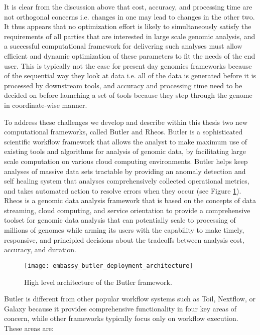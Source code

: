 It is clear from the discussion above that cost, accuracy, and processing time are not orthogonal concerns i.e. changes in one may lead to changes in the other two. It thus appears that no optimization effort is likely to simultaneously satisfy the requirements of all parties that are interested in large scale genomic analysis, and a successful computational framework for delivering such analyses must allow efficient and dynamic optimization of these parameters to fit the needs of the end user. This is typically not the case for present day genomics frameworks because of the sequential way they look at data\autocite{mckenna2010genome, van2013fastq} i.e. all of the data is generated before it is processed by downstream tools, and accuracy and processing time need to be decided on before launching a set of tools because they step through the genome in coordinate-wise manner.

To address these challenges we develop and describe within this thesis two new computational frameworks, called Butler and Rheos. Butler is a sophisticated scientific workflow framework that allows the analyst to make maximum use of existing tools and algorithms for analysis of genomic data, by facilitating large scale computation on various cloud computing environments. Butler helps keep analyses of massive data sets tractable by providing an anomaly detection and self healing system that analyses comprehensively collected operational metrics, and takes automated action to resolve errors when they occur (see Figure \ref{fig:butler_architecture}). Rheos is a genomic data analysis framework that is based on the concepts of data streaming, cloud computing, and service orientation to provide a comprehensive toolset for genomic data analysis that can potentially scale to processing of millions of genomes while arming its users with the capability to make timely, responsive, and principled decisions about the tradeoffs between analysis cost, accuracy, and duration.

\begin{figure}[h!]
\texttt{[image: embassy\_butler\_deployment\_architecture]}
\centering
\caption {High level architecture of the Butler framework.}
\label{fig:butler_architecture}
\end{figure}

Butler is different from other popular workflow systems such as Toil\autocite{vivian2017toil}, Nextflow\autocite{di2017nextflow}, or Galaxy\autocite{goecks2010galaxy} because it provides comprehensive functionality in four key areas of concern, while other frameworks typically focus only on workflow execution. These areas are:

